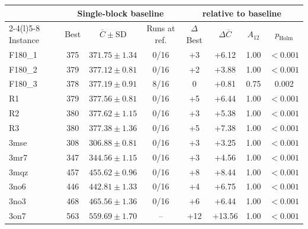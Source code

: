 \begin{tabular}{@{}lccccccc@{}}
\toprule
& \multicolumn{3}{c}{Single-block baseline} & \multicolumn{4}{c}{\method{} relative to baseline} \\
\cmidrule(lr){2-4}\cmidrule(l){5-8}
Instance & Best & $\overline C\pm\mathrm{SD}$ & Runs at ref. & $\Delta$Best & $\Delta\overline C$ & $A_{12}$ & $p_{\mathrm{Holm}}$ \\
\midrule
F180\_1 & 375 & $371.75\pm1.34$ & 0/16 & +3 & +6.12 & 1.00 & $<\!0.001$ \\
F180\_2 & 379 & $377.12\pm0.81$ & 0/16 & +2 & +3.88 & 1.00 & $<\!0.001$ \\
F180\_3 & 378 & $377.19\pm0.91$ & 8/16 & 0 & +0.81 & 0.75 & 0.002 \\
R1 & 379 & $377.56\pm0.81$ & 0/16 & +5 & +6.44 & 1.00 & $<\!0.001$ \\
R2 & 380 & $377.62\pm1.15$ & 0/16 & +3 & +5.38 & 1.00 & $<\!0.001$ \\
R3 & 380 & $377.38\pm1.36$ & 0/16 & +5 & +7.38 & 1.00 & $<\!0.001$ \\
3mse & 308 & $306.88\pm0.81$ & 0/16 & +3 & +3.25 & 1.00 & $<\!0.001$ \\
3mr7 & 347 & $344.56\pm1.15$ & 0/16 & +3 & +4.56 & 1.00 & $<\!0.001$ \\
3mqz & 457 & $455.62\pm0.96$ & 0/16 & +8 & +8.44 & 1.00 & $<\!0.001$ \\
3no6 & 446 & $442.81\pm1.33$ & 0/16 & +4 & +6.75 & 1.00 & $<\!0.001$ \\
3no3 & 468 & $465.56\pm1.36$ & 0/16 & +6 & +6.44 & 1.00 & $<\!0.001$ \\
3on7 & 563 & $559.69\pm1.70$ & -- & +12 & +13.56 & 1.00 & $<\!0.001$ \\
\bottomrule
\end{tabular}
